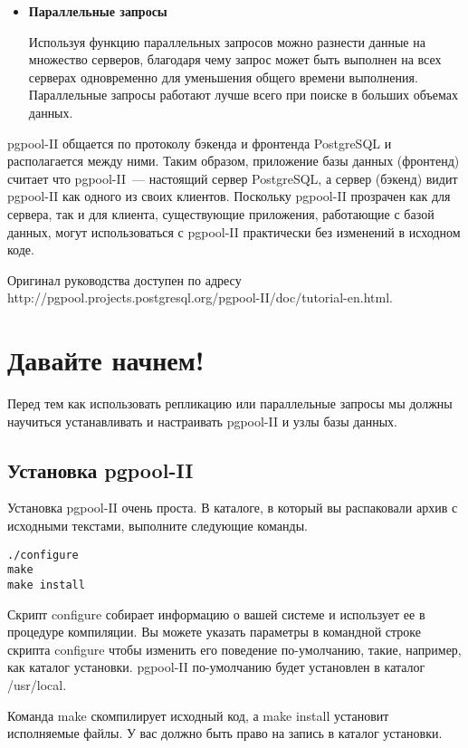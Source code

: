 \begin{itemize}
\item \textbf{Параллельные запросы}

Используя функцию параллельных запросов можно разнести данные на множество серверов, благодаря чему запрос может 
быть выполнен на всех серверах одновременно для уменьшения общего времени выполнения. Параллельные запросы работают 
лучше всего при поиске в больших объемах данных.
\end{itemize}

pgpool-II общается по протоколу бэкенда и фронтенда PostgreSQL и располагается между ними. 
Таким образом, приложение базы данных (фронтенд) считает что pgpool-II~--- настоящий сервер PostgreSQL, а сервер (бэкенд) 
видит pgpool-II как одного из своих клиентов. Поскольку pgpool-II прозрачен как для сервера, так и для клиента, 
существующие приложения, работающие с базой данных, могут использоваться с pgpool-II практически без изменений в исходном коде.

Оригинал руководства доступен по адресу http://pgpool.projects.postgresql.org/pgpool-II/doc/tutorial-en.html.

\section{Давайте начнем!}
\label{sec:pgpool-II-begin}
Перед тем как использовать репликацию или параллельные запросы мы должны научиться устанавливать и настраивать pgpool-II 
и узлы базы данных.

\subsection{Установка pgpool-II}
Установка pgpool-II очень проста. В каталоге, в который вы распаковали архив 
с исходными текстами, выполните следующие команды.
\begin{lstlisting}[label=lst:pgpool1,caption=Установка pgpool-II]
./configure
make
make install
\end{lstlisting}

Скрипт configure собирает информацию о вашей системе и использует ее в процедуре компиляции. Вы можете 
указать параметры в командной строке скрипта configure чтобы изменить его поведение по-умолчанию, такие, например, 
как каталог установки. pgpool-II по-умолчанию будет установлен в каталог /usr/local.

Команда make скомпилирует исходный код, а make install установит исполняемые файлы. У вас должно быть право на 
запись в каталог установки.

